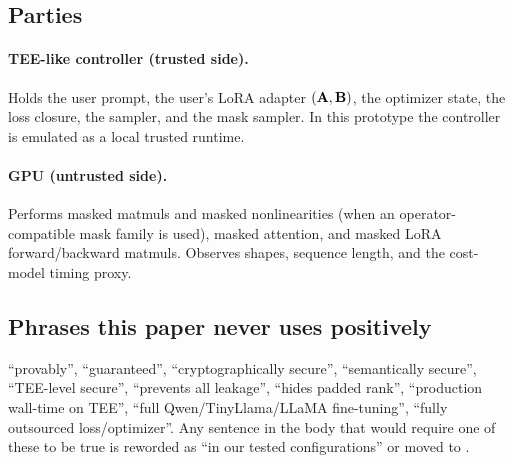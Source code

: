 \subsection*{Parties}
\paragraph{TEE-like controller (trusted side).} Holds the user prompt, the user's LoRA adapter $(\mathbf{A}, \mathbf{B})$, the optimizer state, the loss closure, the sampler, and the mask sampler. In this prototype the controller is emulated as a local trusted runtime.

\paragraph{GPU (untrusted side).} Performs masked matmuls and masked nonlinearities (when an operator-compatible mask family is used), masked attention, and masked LoRA forward/backward matmuls. Observes shapes, sequence length, and the cost-model timing proxy.

\subsection*{Phrases this paper never uses positively}
``provably'', ``guaranteed'', ``cryptographically secure'', ``semantically secure'', ``TEE-level secure'', ``prevents all leakage'', ``hides padded rank'', ``production wall-time on TEE'', ``full Qwen/TinyLlama/LLaMA fine-tuning'', ``fully outsourced loss/optimizer''. Any sentence in the body that would require one of these to be true is reworded as ``in our tested configurations'' or moved to .
